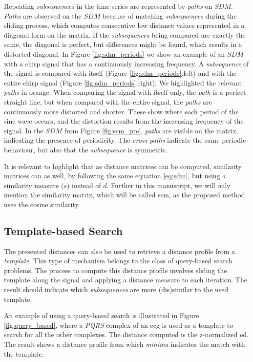 Repeating \textit{subsequences} in the time series are represented by \textit{paths} on $SDM$. \textit{Paths} are observed on the $SDM$ because of matching \textit{subsequences} during the sliding process, which computes consecutive low distance values represented in a diagonal form on the matrix. If the \textit{subsequences} being compared are exactly the same, the diagonal is perfect, but differences might be found, which results in a distorted diagonal. In Figure \ref{fig:sdm_periods} we show an example of an $SDM$ with a chirp signal that has a continuously increasing frequency. A \textit{subsequence} of the signal is compared with itself (Figure \ref{fig:sdm_periods}.left) and with the entire chirp signal (Figure \ref{fig:sdm_periods}.right). We highlighted the relevant \textit{paths} in orange. When comparing the signal with itself only, the \textit{path} is a perfect straight line, but when compared with the entire signal, the \textit{paths} are continuously more distorted and shorter. These show where each period of the sine wave occurs, and the distortion results from the increasing frequency of the signal. In the $SDM$ from Figure \ref{fig:ssm_pre}, \textit{paths} are visible on the matrix, indicating the presence of periodicity. The \textit{cross-paths} indicate the same periodic behaviour, but also that the \textit{subsequence} is symmetric.

It is relevant to highlight that as distance matrices can be computed, similarity matrices can as well, by following the same equation \ref{eq:sdm}, but using a similarity measure ($s$) instead of $d$. Further in this manuscript, we will only mention the similarity matrix, which will be called \gls{ssm}, as the proposed method uses the cosine similarity.

\subsection{Template-based Search}
\label{subsec:query_based_search}

The presented distances can also be used to retrieve a distance profile from a \textit{template}. This type of mechanism belongs to the class of query-based search problems. The process to compute this distance profile involves sliding the template along the signal and applying a distance measure to each iteration. The result should indicate which \textit{subsequences} are more (dis)similar to the used template.
\par
An example of using a query-based search is illustrated in Figure \ref{fig:query_based}, where a \textit{PQRS} complex of an \gls{ecg} is used as a template to search for all the other complexes. The distance computed is the z-normalized \gls{ed}. The result shows a distance profile from which \textit{minima} indicates the match with the template.

